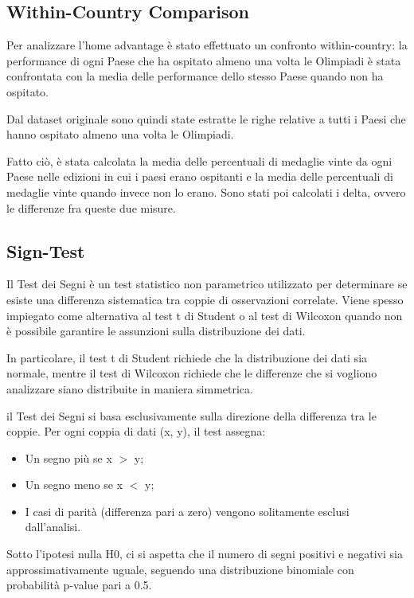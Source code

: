 \subsection{Within-Country Comparison}\label{sec:methods_data}

Per analizzare l’home advantage è stato effettuato un confronto within-country: la performance di ogni Paese che ha ospitato almeno una volta le Olimpiadi è stata confrontata con la media delle performance dello stesso Paese quando non ha ospitato.

Dal dataset originale sono quindi state estratte le righe relative a tutti i Paesi che hanno ospitato almeno una volta le Olimpiadi.

Fatto ciò, è stata calcolata la media delle percentuali di medaglie vinte da ogni Paese nelle edizioni in cui i paesi erano ospitanti e la media delle percentuali di medaglie vinte quando invece non lo erano. Sono stati poi calcolati i delta, ovvero le differenze fra queste due misure.

\subsection*{Sign-Test}
Il Test dei Segni è un test statistico non parametrico utilizzato per determinare se esiste una differenza sistematica tra coppie di osservazioni correlate. Viene spesso impiegato come alternativa al test t di Student o al test di Wilcoxon quando non è possibile garantire le assunzioni sulla distribuzione dei dati.

In particolare, il test t di Student richiede che la distribuzione dei dati sia normale, mentre il test di Wilcoxon richiede che le differenze che si vogliono analizzare siano distribuite in maniera simmetrica.

il Test dei Segni si basa esclusivamente sulla direzione della differenza tra le coppie. Per ogni coppia di dati (x, y), il test assegna:

\begin{itemize}
    \item Un segno più se x $>$ y;
    \item Un segno meno se x $<$ y;
    \item I casi di parità (differenza pari a zero) vengono solitamente esclusi dall'analisi.
\end{itemize}

Sotto l'ipotesi nulla H0, ci si aspetta che il numero di segni positivi e negativi sia approssimativamente uguale, seguendo una distribuzione binomiale con probabilità p-value pari a 0.5.

